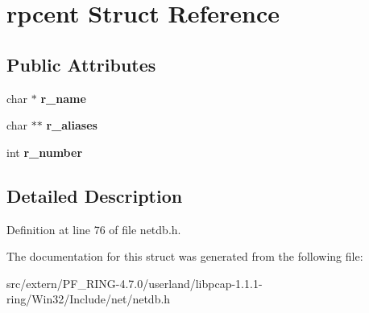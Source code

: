 \hypertarget{structrpcent}{
\section{rpcent Struct Reference}
\label{structrpcent}
}
\subsection*{Public Attributes}
\begin{DoxyCompactItemize}
\item 
\hypertarget{structrpcent_a42ba13c2cd06cdc425897be2b858a26a}{
char $\ast$ {\bfseries r\_\-name}}
\label{structrpcent_a42ba13c2cd06cdc425897be2b858a26a}

\item 
\hypertarget{structrpcent_a1cebfd67aba5fc74306e4ea5d4427093}{
char $\ast$$\ast$ {\bfseries r\_\-aliases}}
\label{structrpcent_a1cebfd67aba5fc74306e4ea5d4427093}

\item 
\hypertarget{structrpcent_a9b208aebe40575a085ce3186471737bc}{
int {\bfseries r\_\-number}}
\label{structrpcent_a9b208aebe40575a085ce3186471737bc}

\end{DoxyCompactItemize}


\subsection{Detailed Description}


Definition at line 76 of file netdb.h.



The documentation for this struct was generated from the following file:\begin{DoxyCompactItemize}
\item 
src/extern/PF\_\-RING-\/4.7.0/userland/libpcap-\/1.1.1-\/ring/Win32/Include/net/netdb.h\end{DoxyCompactItemize}
